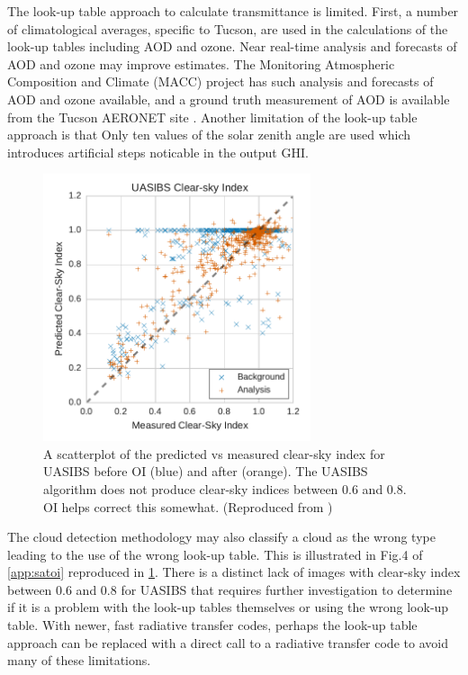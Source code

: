 The look-up table approach to calculate transmittance is limited.
First, a number of climatological averages, specific to Tucson, are
used in the calculations of the look-up tables including AOD and
ozone.
Near real-time analysis and forecasts of AOD and ozone may improve
estimates.
The Monitoring Atmospheric Composition and Climate (MACC) project
\citep{Morcrette2009} has such analysis and forecasts of AOD and ozone
available, and a ground truth measurement of AOD is available from the
Tucson AERONET site \citep{Holben1998}.
Another limitation of the look-up table approach is that Only ten
values of the solar zenith angle are used which introduces artificial
steps noticable in the output GHI.

\begin{figure}[h]
\centering
\includegraphics[width=0.7\textwidth]{figs/uasibs_scatter.pdf}
\caption[Scatterplot of predicted vs measured clear-sky index for
UASIBS]{A scatterplot of the predicted vs measured clear-sky index for
UASIBS before OI (blue) and after (orange). The UASIBS algorithm does
not produce clear-sky indices between 0.6 and 0.8. OI helps correct
this somewhat. (Reproduced from \cite{Lorenzo2017})}
\label{fig:uasibs_scatter}
\end{figure}

The cloud detection methodology may also classify a cloud as the wrong
type leading to the use of the wrong look-up table.
This is illustrated in Fig.\@ 4 of \cref{app:satoi} reproduced in
\cref{fig:uasibs_scatter}.
There is a distinct lack of images with clear-sky index between 0.6
and 0.8 for UASIBS that requires further investigation to determine if
it is a problem with the look-up tables themselves or using the wrong
look-up table.
With newer, fast radiative transfer codes, perhaps the look-up table
approach can be replaced with a direct call to a radiative transfer
code to avoid many of these limitations.

